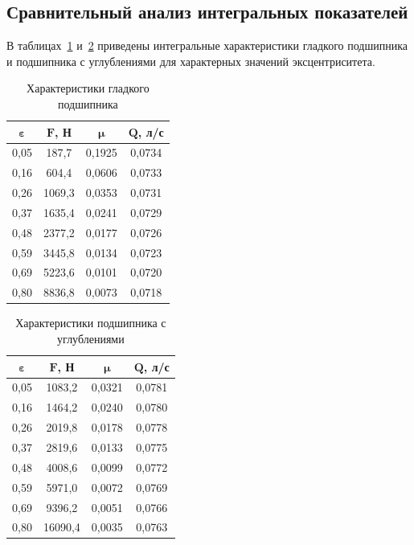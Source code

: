 \subsection{Сравнительный анализ интегральных показателей}

В таблицах~\ref{tab:smooth_results} и~\ref{tab:textured_results} приведены интегральные характеристики гладкого подшипника и подшипника с \varDimpleTypeGenitive{} углублениями для характерных значений эксцентриситета.

\begin{table}[H]
\small
\centering
\caption{Характеристики гладкого подшипника}
\label{tab:smooth_results}
\begin{tabular}{|c|c|c|c|}
\hline
$\boldsymbol{\varepsilon}$ & $\boldsymbol{F}$\textbf{, Н} & $\boldsymbol{\mu}$ & $\boldsymbol{Q}$\textbf{, л/с} \\
\hline
0{,}05 & 187{,}7 & 0{,}1925 & 0{,}0734 \\
\hline
0{,}16 & 604{,}4 & 0{,}0606 & 0{,}0733 \\
\hline
0{,}26 & 1069{,}3 & 0{,}0353 & 0{,}0731 \\
\hline
0{,}37 & 1635{,}4 & 0{,}0241 & 0{,}0729 \\
\hline
0{,}48 & 2377{,}2 & 0{,}0177 & 0{,}0726 \\
\hline
0{,}59 & 3445{,}8 & 0{,}0134 & 0{,}0723 \\
\hline
0{,}69 & 5223{,}6 & 0{,}0101 & 0{,}0720 \\
\hline
0{,}80 & 8836{,}8 & 0{,}0073 & 0{,}0718 \\
\hline
\end{tabular}
\end{table}

\begin{table}[H]
\small
\centering
\caption{Характеристики подшипника с \varDimpleTypeGenitive{} углублениями}
\label{tab:textured_results}
\begin{tabular}{|c|c|c|c|}
\hline
$\boldsymbol{\varepsilon}$ & $\boldsymbol{F}$\textbf{, Н} & $\boldsymbol{\mu}$ & $\boldsymbol{Q}$\textbf{, л/с} \\
\hline
0{,}05 & 1083{,}2 & 0{,}0321 & 0{,}0781 \\
\hline
0{,}16 & 1464{,}2 & 0{,}0240 & 0{,}0780 \\
\hline
0{,}26 & 2019{,}8 & 0{,}0178 & 0{,}0778 \\
\hline
0{,}37 & 2819{,}6 & 0{,}0133 & 0{,}0775 \\
\hline
0{,}48 & 4008{,}6 & 0{,}0099 & 0{,}0772 \\
\hline
0{,}59 & 5971{,}0 & 0{,}0072 & 0{,}0769 \\
\hline
0{,}69 & 9396{,}2 & 0{,}0051 & 0{,}0766 \\
\hline
0{,}80 & 16090{,}4 & 0{,}0035 & 0{,}0763 \\
\hline
\end{tabular}
\end{table}

